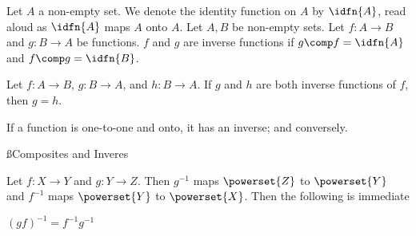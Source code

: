 Let $A$ a non-empty set.
We denote the identity
function on $A$ by $\idfn{A}$,
read aloud as
$\idfn{A}$ maps $A$ onto $A$.
Let $A, B$ be non-empty sets.
Let $f: A \to B$ and $g: B \to A$
be functions.
$f$ and $g$ are inverse functions
if $g \comp f = \idfn{A}$
and $f \comp g = \idfn{B}$.



\begin{prop}[Uniqueness]
  Let $f: A \to B$,
  $g: B \to A$,
  and $h: B \to A$.
  If $g$ and $h$
  are both inverse
  functions of $f$,
  then $g = h$.
\end{prop}

\begin{prop}[Existence]
  If a function is one-to-one and onto, it has an inverse; and conversely.
\end{prop}

\ss{Composites and Inveres}

Let $f: X \to Y$ and $g: Y \to Z$.
Then $g^{-1}$ maps $\powerset{Z}$ to $\powerset{Y}$ and $f^{-1}$ maps $\powerset{Y}$ to $\powerset{X}$.
Then the following is immediate
{\small
\begin{proposition}
  $(gf)^{-1} = f^{-1}g^{-1}$
\end{proposition}
}

%

%
